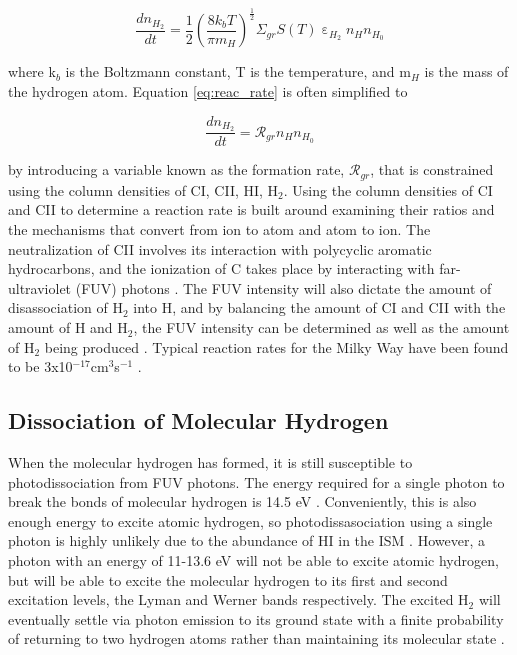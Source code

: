 \begin{equation}\label{eq:reac_rate}
  \frac{dn_{H_2}}{dt} = \frac{1}{2}\left(\frac{8k_bT}{\pi m_H}\right)^\frac{1}{2}\Sigma_{gr}S\left(T\right)\upepsilon_{H_2}n_{H}n_{H_0}
\end{equation}

\noindent where k$_b$ is the Boltzmann constant, T is the temperature, and m$_H$ is the mass of the hydrogen atom.  Equation \ref{eq:reac_rate} is often simplified to 

\begin{equation}\label{eq:reac_rate_sm}
  \frac{dn_{H_2}}{dt} = \mathcal{R}_{gr}n_H n_{H_0}
\end{equation}

\noindent by introducing a variable known as the formation rate, $\mathcal{R}_{gr}$, that is constrained using the column densities of CI, CII, HI, H$_2$.  Using the column densities of CI and CII to determine a reaction rate is built around examining their ratios and the mechanisms that convert from ion to atom and atom to ion.  The neutralization of CII involves its interaction with polycyclic aromatic hydrocarbons, and the ionization of C takes place by interacting with far-ultraviolet (FUV) photons \citep{wolfire2008}.  The FUV intensity will also dictate the amount of disassociation of H$_2$ into H, and by balancing the amount of CI and CII with the amount of H and H$_2$, the FUV intensity can be determined as well as the amount of H$_2$ being produced \citep{wolfire2008}.  Typical reaction rates for the Milky Way have been found to be 3x10$^{-17}$cm$^3$s$^{-1}$ \citep{jura1975, gry2002, wolfire2008}.

\subsection{Dissociation of Molecular Hydrogen}\label{h2destroy}

When the molecular hydrogen has formed, it is still susceptible to photodissociation from FUV photons.  The energy required for a single photon to break the bonds of molecular hydrogen is 14.5 eV \citep{krumholz2014}.  Conveniently, this is also enough energy to excite atomic hydrogen, so photodissasociation using a single photon is highly unlikely due to the abundance of HI in the ISM \citep{krumholz2014}.  However, a photon with an energy of 11-13.6 eV will not be able to excite atomic hydrogen, but will be able to excite the molecular hydrogen to its first and second excitation levels, the Lyman and Werner bands respectively.  The excited H$_2$ will eventually settle via photon emission to its ground state with a finite probability of returning to two hydrogen atoms rather than maintaining its molecular state \citep{krumholz2014}.

